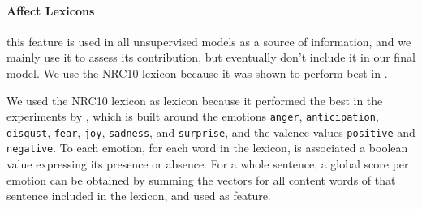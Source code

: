 \documentclass[11pt]{article}
\newcommand{\note}[1]{\textbf{*** #1 ***}}
\begin{document}
\paragraph{Affect Lexicons} this feature is used in all unsupervised models as a source of information, and we mainly use it to assess its contribution, but eventually don't include it in our final model. We use the NRC10 lexicon because it was shown to perform best in \cite{mohammad:2012:NAACL-HLT}.

We used the NRC10 lexicon as lexicon because it performed the best in the experiments by \cite{mohammad:2012:NAACL-HLT}, which is built around the emotions \texttt{anger}, \texttt{anticipation}, \texttt{disgust}, \texttt{fear}, \texttt{joy}, \texttt{sadness}, and \texttt{surprise}, and the valence values \texttt{positive} and \texttt{negative}. To each emotion, for each word in the lexicon, is associated a boolean value expressing its presence or absence. For a whole sentence, a global score per emotion can be obtained by summing the vectors for all content words of that sentence included in the lexicon, and used as feature.
%
\end{document}
